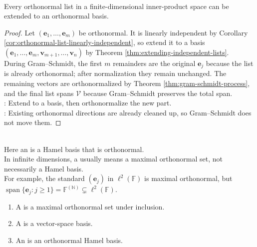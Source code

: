 \begin{corollary} \label{cor:orthonormal-list-extends-to-basis} \\
Every orthonormal list in a finite-dimensional inner-product space can be extended to an orthonormal basis.
\begin{proof}
Let $(\mathbf{e}_1,\ldots,\mathbf{e}_m)$ be orthonormal. It is linearly independent by Corollary \ref{cor:orthonormal-list-linearly-independent}, so extend it to a basis $(\mathbf{e}_1,\ldots,\mathbf{e}_m,\mathbf{v}_{m+1},\ldots,\mathbf{v}_n)$ by Theorem \ref{thm:extending-independent-lists}. \\
During Gram--Schmidt, the first $m$ remainders are the original $\mathbf{e}_j$ because the list is already orthonormal; after normalization they remain unchanged. The remaining vectors are orthonormalized by Theorem \ref{thm:gram-schmidt-process}, and the final list spans $\mathcal{V}$ because Gram--Schmidt preserves the total span.\\
: Extend to a basis, then orthonormalize the new part.\\
: Existing orthonormal directions are already cleaned up, so Gram--Schmidt does not move them.
\end{proof}
\end{corollary}

\begin{perspective} \label{per:hamel-hilbert-basis-warning} \\
Here an  is a Hamel basis that is orthonormal.\\
In infinite dimensions, a  usually means a maximal orthonormal set, not necessarily a Hamel basis.\\
For example, the standard $(\mathbf{e}_j)$ in $\ell^2(\mathbb{F})$ is maximal orthonormal, but $\operatorname{span}\{\mathbf{e}_j:j\geq1\}=\mathbb{F}^{(\mathbb{N})}\subsetneq\ell^2(\mathbb{F})$.
\end{perspective}

\begin{definition} \label{def:hilbert-basis-versus-hamel-basis} 
\begin{enumerate}[label=(\roman*)]
\setlength{\itemsep}{0pt}
\item A  is a maximal orthonormal set under inclusion.
\item A  is a vector-space basis.
\item An  is an orthonormal Hamel basis.
\end{enumerate}
\end{definition}

